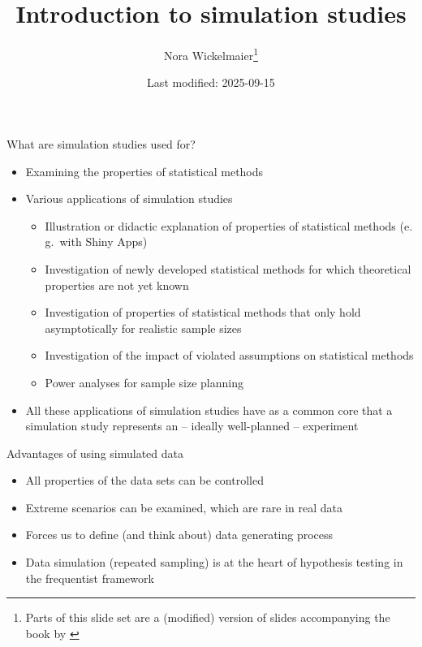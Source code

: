 \documentclass[aspectratio=169]{beamer}
\title{Introduction to simulation studies}
\author{Nora Wickelmaier\footnote{Parts of this slide set are a (modified)
version of slides accompanying the book by \citet{Strobl2024}}}
\date{Last modified: 2025-09-15}
\begin{document}
\begin{frame}{}
\thispagestyle{empty}
\titlepage
\end{frame}


\begin{frame}{What are simulation studies used for?}
  \begin{itemize}
    \item Examining the properties of statistical methods
    \item Various applications of simulation studies
      \begin{itemize}
        \item Illustration or didactic explanation of properties of statistical
          methods (e.\,g.\ with Shiny Apps)
        \item Investigation of newly developed statistical methods for which
          theoretical properties are not yet known
        \item Investigation of properties of statistical methods that only hold
          asymptotically for realistic sample sizes
        \item Investigation of the impact of violated assumptions on statistical
          methods
        \item Power analyses for sample size planning
      \end{itemize}
    \item All these applications of simulation studies have as a common core
      that a simulation study represents an -- ideally well-planned --
      experiment
  \end{itemize}
  \vfill
\end{frame}

\begin{frame}{Advantages of using simulated data}
  \begin{itemize}
    \item All properties of the data sets can be controlled
    \item Extreme scenarios can be examined, which are rare in real data
    \item Forces us to define (and think about) data generating process
    \item Data simulation (repeated sampling) is at the heart of hypothesis
      testing in the frequentist framework
  \end{itemize}
  \vfill
\end{frame}
\end{document}
